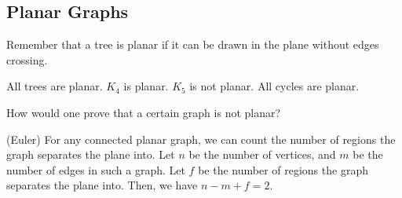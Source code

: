 \subsection{Planar Graphs}

Remember that a tree is planar if it can be drawn in the plane without edges crossing.

\begin{eg}
	All trees are planar. \( K_4 \) is planar. \( K_5 \) is not planar. All cycles are planar.
\end{eg}

How would one prove that a certain graph is not planar?

\begin{theorem}
	(Euler) For any connected planar graph, we can count the number of regions the graph separates the plane into. Let \( n \) be the number of vertices, and \( m \) be the number of edges in such a graph. Let \( f \) be the number of regions the graph separates the plane into. Then, we have \( n - m + f = 2\).
\end{theorem}
